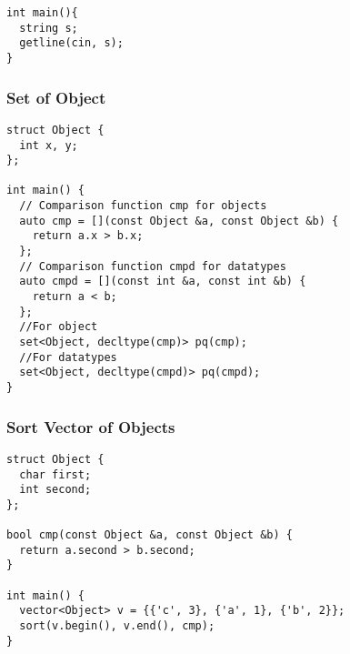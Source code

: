 \documentclass[twoside]{article}
\begin{document}
\begin{multicols*}{2}
\begin{verbatim}
int main(){
  string s;
  getline(cin, s);
}
\end{verbatim}

{
\subsubsection*{Set of Object}
}
\begin{verbatim}
struct Object {
  int x, y;
};

int main() {
  // Comparison function cmp for objects
  auto cmp = [](const Object &a, const Object &b) {
    return a.x > b.x;
  };
  // Comparison function cmpd for datatypes
  auto cmpd = [](const int &a, const int &b) {
    return a < b;
  };
  //For object
  set<Object, decltype(cmp)> pq(cmp);
  //For datatypes
  set<Object, decltype(cmpd)> pq(cmpd);
}

\end{verbatim}

{
\subsubsection*{Sort Vector of Objects}
}
\begin{verbatim}
struct Object {
  char first;
  int second;
};

bool cmp(const Object &a, const Object &b) {
  return a.second > b.second;
}

int main() {
  vector<Object> v = {{'c', 3}, {'a', 1}, {'b', 2}};
  sort(v.begin(), v.end(), cmp);
}
\end{verbatim}

{
}
\end{multicols*}
\end{document}
